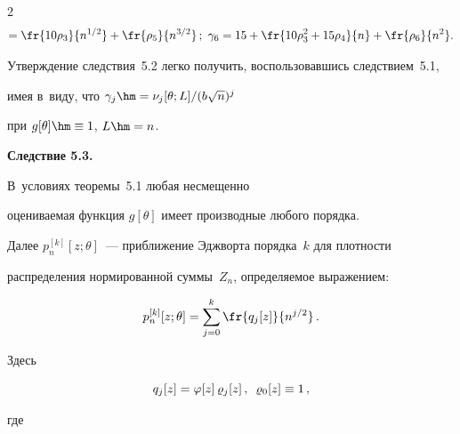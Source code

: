 \begin{multicols}{2}
\begin{gather*}
   =\fr{10\rho_3}{n^{1/2}} +\fr{\rho_5}{n^{3/2}}\,;\


 \gamma_6=15+\fr{10\rho_3^2+15\rho_4}{n}+\fr{\rho_6}{n^2}.




 \end{gather*}





\smallskip





  Утверждение следствия~5.2 легко получить, воспользовавшись следствием~5.1,


 имея в~виду, что $\gamma_j\hm=\nu_j[\theta;L]/(b\sqrt{n})^j$


 при $g[\theta]\hm\equiv 1$, $L\hm=n$.





\smallskip





\noindent


\textbf{Следствие 5.3.}\


 В~условиях теоремы~5.1 любая несмещенно


 оцениваемая функция $g[\theta]$ имеет производные любого порядка.





\smallskip





 Далее $p^{[k]}_n[z;\theta]$~--- приближение Эджворта порядка~$k$ для плотности 


 распределения нормированной суммы~$Z_n$, определяемое выражением:


 \begin{equation}


p^{[k]}_n[z;\theta]=\sum\limits_{j=0}^k \fr{q_j[z]}{n^{j/2}}\,.


 \label{6:0}


 \end{equation}


 Здесь


 $$


 q_j[z]=\varphi[z]\,\varrho_j[z]\,,\enskip \varrho_0[z]\equiv 1\,,


 $$


 где


 \begin{multline}



\end{multline}
\end{multicols}
